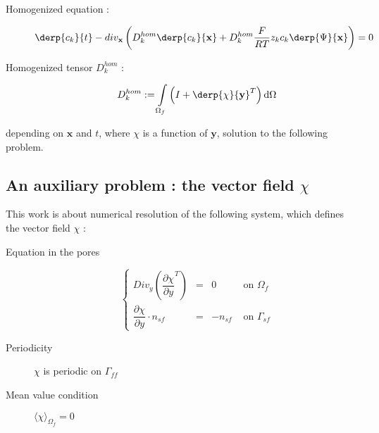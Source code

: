 \begin{description}
\item[Homogenized equation :] %
\[\derp{c_k}{t}-div_{\mathbf{x}}\left(D_k^{hom}\derp{c_k}{\mathbf{x}}+D_k^{hom}\frac{F}{RT}z_k c_k\derp{\Psi}{\mathbf{x}}\right)=0\]
\item[Homogenized tensor $D_k^{hom}$ :] 
\[D_k^{hom}:=\int\limits_{\Omega_f}\left(I+\derp{\chi}{\mathbf{y}}^T\right)\text{d}\Omega\]
\end{description}

depending on $\mathbf{x}$ and $t$, %
where $\chi$ is a function of $\mathbf{y}$, %
solution to the following problem.

\begin{comment}
\begin{rema}
In this paragraph we have skipped adimensionalization of the physical equations, which is prior to asymptotical analysis. %
Anyway, if doesn't change the general idea of the proof.
\end{rema}
\end{comment}

\subsection{An auxiliary problem : the vector field $\chi$}

This work is about numerical resolution of the following system, which defines the vector field $\chi$ :

\begin{description}
\item[Equation in the pores] 
\begin{equation}\label{chistr}
\left\{%
\begin{array}{lccr}
Div_y \left( \dfrac{\partial{\chi}}{\partial{y}}^T\right) &=& 0&\text{ on }\Omega_f \\
\dfrac{\partial{\chi}}{\partial{y}} \cdot n_{sf}&=&-n_{sf}&\text{ on }\Gamma_{sf}
\end{array}
\right.
\end{equation}
\item[Periodicity] $\chi$ is periodic on $\Gamma_{ff}$
\item[Mean value condition] $\langle\chi\rangle_{\Omega_f}=0$
\end{description}

